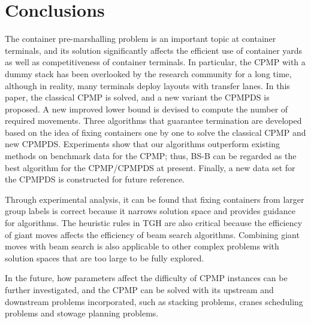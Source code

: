 \documentclass[review,3p,times,authoryear,12pt]{elsarticle}
\begin{document}
\section{Conclusions}
\label{sec:con}

The container pre-marshalling problem is an important topic at container terminals, and its solution significantly affects the efficient use of container yards as well as competitiveness of container terminals.
In particular, the CPMP with a dummy stack has been overlooked by the research community for a long time, although in reality, many terminals deploy layouts with transfer lanes.
In this paper, the classical CPMP is solved, and a new variant the CPMPDS is proposed.
A new improved lower bound is devised to compute the number of required movements.
Three algorithms that guarantee termination are developed based on the idea of fixing containers one by one to solve the classical CPMP and new CPMPDS.
Experiments show that our algorithms outperform existing methods on benchmark data for the CPMP; thus, BS-B can be regarded as the best algorithm for the CPMP/CPMPDS at present.
Finally, a new data set for the CPMPDS is constructed for future reference.

Through experimental analysis, it can be found that fixing containers from larger group labels is correct because it narrows solution space and provides guidance for algorithms.
The heuristic rules in TGH are also critical because the efficiency of giant moves affects the efficiency of beam search algorithms.
Combining giant moves with beam search is also applicable to other complex problems with solution spaces that are too large to be fully explored.

In the future, how parameters affect the difficulty of CPMP instances can be further investigated, and the CPMP can be solved with its upstream and downstream problems incorporated, such as stacking problems, cranes scheduling problems and stowage planning problems.






\end{document}
